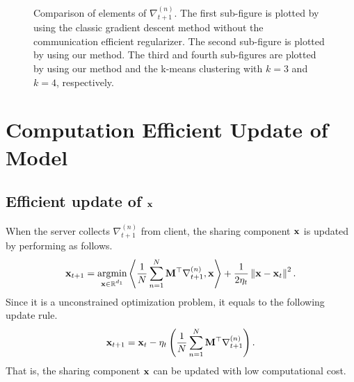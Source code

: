 \documentclass[journal]{IEEEtran}
\begin{document}
\begin{figure}[!]
\caption{Comparison of elements of $\nabla_{t+1}^{(n)}$. The first sub-figure is plotted by using the classic gradient descent method without the communication efficient regularizer. The second sub-figure is plotted by using our method. The third and fourth sub-figures are plotted by using our method and the k-means clustering with $k=3$ and $k=4$, respectively.  }
\label{figure_illustrative_communication_efficient_clustering}
\end{figure}

\section{Computation Efficient Update of Model}

\subsection{Efficient update of ${\bf x}$} 

When the server collects $\nabla_{t+1}^{(n)}$ from client, the sharing component ${\bf x}$ is updated by performing as follows.
\begin{align}
\nonumber
\x_{t+1} = \argmin_{\substack{\x\in\RR^{d_1}}}  \lrangle{\frac{1}{N}\sum_{n=1}^N\M^\top\nabla_{t+1}^{(n)}, \x} + \frac{1}{2\eta_t}\lrnorm{\x - \x_t}^2.
\end{align} Since it is a unconstrained optimization problem, it equals to the following update rule.
\begin{align}
\nonumber
{\bf x}_{t+1} = {\bf x}_t - \eta_t \left( \frac{1}{N}\sum_{n=1}^N{\bf M}^\top\nabla_{t+1}^{(n)} \right).
\end{align} That is, the sharing component ${\bf x}$ can be updated with low computational cost.
\end{document}
